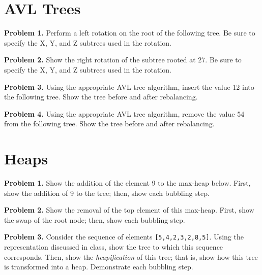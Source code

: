 \documentclass{article}
\begin{document}
\section{AVL Trees}

\noindent \textbf{Problem 1.} Perform a left rotation on the root of the following tree.  Be sure to specify the X, Y, and Z subtrees used in the rotation.


\noindent \textbf{Problem 2.} Show the right rotation of the subtree rooted at 27.  Be sure to specify the X, Y, and Z subtrees used in the rotation.



\noindent \textbf{Problem 3.} Using the appropriate AVL tree algorithm, insert the value 12 into the following tree.  Show the tree before and after rebalancing.



\noindent \textbf{Problem 4.} Using the appropriate AVL tree algorithm, remove the value 54 from the following tree.  Show the tree before and after rebalancing.



\section{Heaps}

\noindent \textbf{Problem 1.} Show the addition of the element 9 to the max-heap below.  First, show the addition of 9 to the tree; then, show each bubbling step.



\noindent \textbf{Problem 2.} Show the removal of the top element of this max-heap.  First, show the swap of the root node; then, show each bubbling step.



\noindent \textbf{Problem 3.} Consider the sequence of elements \texttt{[5,4,2,3,2,8,5]}.  Using the representation discussed in class, show the tree to which this sequence corresponds.  Then, show the \textit{heapification} of this tree; that is, show how this tree is transformed into a heap.  Demonstrate each bubbling step.


\end{document}
